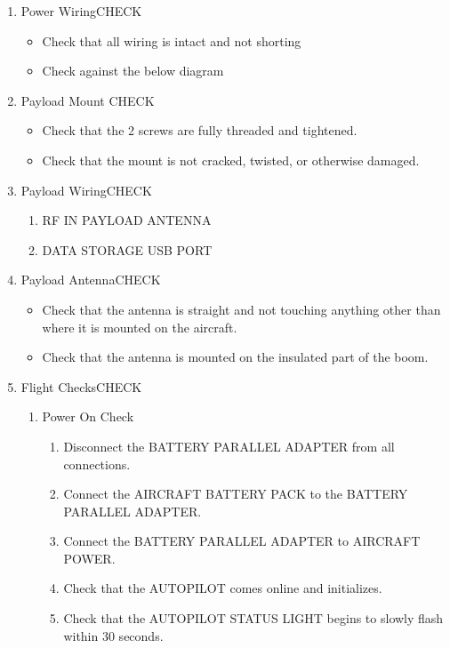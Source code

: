 \documentclass{report}
\begin{document}
\begin{enumerate}
\begin{enumerate}
				\end{enumerate}
			\item Power Wiring\hrulefill CHECK
				\begin{itemize}
					\item Check that all wiring is intact and not shorting
					\item Check against the below diagram
				\end{itemize}
			\item Payload Mount \hrulefill CHECK
				\begin{itemize}
					\item Check that the 2 screws are fully threaded and tightened.
					\item Check that the mount is not cracked, twisted, or otherwise damaged.
				\end{itemize}
			\item Payload Wiring\hrulefill CHECK
				\begin{enumerate}
					\item RF IN \dotfill PAYLOAD ANTENNA
					\item DATA STORAGE \dotfill USB PORT
				\end{enumerate}
			\item Payload Antenna\hrulefill CHECK
				\begin{itemize}
					\item Check that the antenna is straight and not touching anything other than where it is mounted on the aircraft.
					\item Check that the antenna is mounted on the insulated part of the boom.
				\end{itemize}
			\item Flight Checks\hrulefill CHECK
				\begin{enumerate}
					\item Power On Check
						\begin{enumerate}
							\item Disconnect the BATTERY PARALLEL ADAPTER from all connections.
							\item Connect the AIRCRAFT BATTERY PACK to the BATTERY PARALLEL ADAPTER.
							\item Connect the BATTERY PARALLEL ADAPTER to AIRCRAFT POWER.
							\item Check that the AUTOPILOT comes online and initializes.
							\item Check that the AUTOPILOT STATUS LIGHT begins to slowly flash within 30 seconds.

\end{enumerate}
\end{enumerate}
\end{enumerate}
\end{document}
